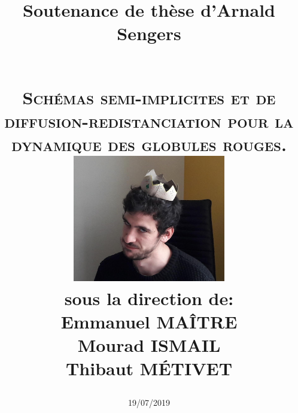 \documentclass[a4paper]{leaflet}
\begin{document}
\begin{titlepage}
  \title{
    Soutenance de thèse d'Arnald Sengers
    \date{19/07/2019} \\
    \textsc{Schémas semi-implicites et de diffusion-redistanciation pour la dynamique des globules rouges.}\\[1cm]    
    \includegraphics[width=0.5\textwidth]{crop} \\
 sous la direction de: \\
Emmanuel MAÎTRE \\
Mourad ISMAIL \\
Thibaut MÉTIVET
}
\end{titlepage}

\maketitle

\newpage
\end{document}
